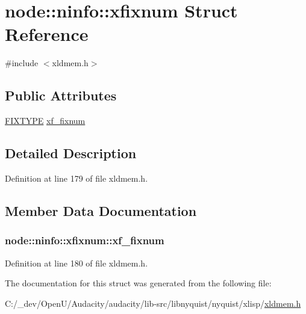 \hypertarget{structnode_1_1ninfo_1_1xfixnum}{}\section{node\+:\+:ninfo\+:\+:xfixnum Struct Reference}
\label{structnode_1_1ninfo_1_1xfixnum}


{\ttfamily \#include $<$xldmem.\+h$>$}

\subsection*{Public Attributes}
\begin{DoxyCompactItemize}
\item 
\hyperlink{xlisp_8h_a0eba123a4f1bee2b6ea609fcfe6cbd40}{F\+I\+X\+T\+Y\+PE} \hyperlink{structnode_1_1ninfo_1_1xfixnum_ab2820b84e6bb619aa8fa62d0d36cba5a}{xf\+\_\+fixnum}
\end{DoxyCompactItemize}


\subsection{Detailed Description}


Definition at line 179 of file xldmem.\+h.



\subsection{Member Data Documentation}
\subsubsection[{\texorpdfstring{xf\+\_\+fixnum}{xf_fixnum}}]{ node\+::ninfo\+::xfixnum\+::xf\+\_\+fixnum}\hypertarget{structnode_1_1ninfo_1_1xfixnum_ab2820b84e6bb619aa8fa62d0d36cba5a}{}\label{structnode_1_1ninfo_1_1xfixnum_ab2820b84e6bb619aa8fa62d0d36cba5a}


Definition at line 180 of file xldmem.\+h.



The documentation for this struct was generated from the following file\+:\begin{DoxyCompactItemize}
\item 
C\+:/\+\_\+dev/\+Open\+U/\+Audacity/audacity/lib-\/src/libnyquist/nyquist/xlisp/\hyperlink{xldmem_8h}{xldmem.\+h}\end{DoxyCompactItemize}
